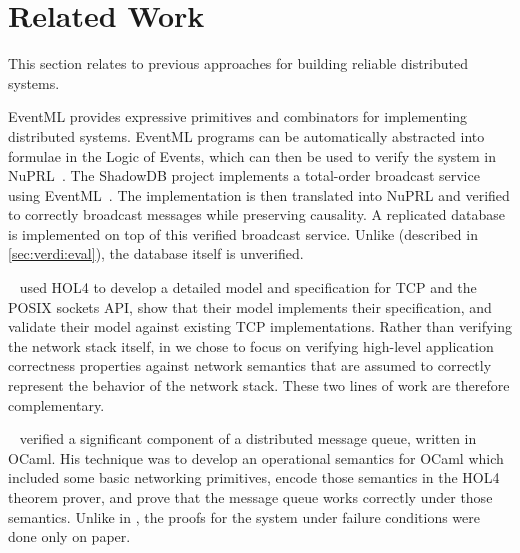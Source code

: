 
\section{Related Work}\label{sec:verdi:related}

This section relates \Verdi to previous approaches for building
reliable distributed systems.

\begin{sloppypar}
EventML \cite{rahli:eventml} provides expressive primitives and
combinators for implementing distributed systems.  EventML programs
can be automatically abstracted into formulae in the Logic of Events,
which can then be used to verify the system in
NuPRL~\cite{constable:nuprl}.  The ShadowDB project implements a
total-order broadcast service using
EventML~\cite{schiper:shadowdb}. The implementation is then translated
into NuPRL and verified to correctly broadcast messages while
preserving causality.  A replicated database is implemented on top of
this verified broadcast service.  Unlike \vard (described in
\cref{sec:verdi:eval}), the database itself is unverified.
\end{sloppypar}

\citeauthor{tcp-hol}~ used HOL4 to develop a detailed model and
specification for TCP and the POSIX sockets API, show that their model
implements their specification, and validate their model against
existing TCP implementations.  Rather than verifying the network stack
itself, in \Verdi we chose to focus on verifying high-level
application correctness properties against network semantics that are
assumed to correctly represent the behavior of the network
stack. These two lines of work are therefore complementary.

\citeauthor{ridge-2009}~ verified a
significant component of a distributed message queue, written in
OCaml. His technique was to develop an operational semantics for OCaml
which included some basic networking primitives, encode those
semantics in the HOL4 theorem prover, and prove that the message queue
works correctly under those semantics. Unlike in \Verdi, the proofs
for the system under failure conditions were done only on paper.

